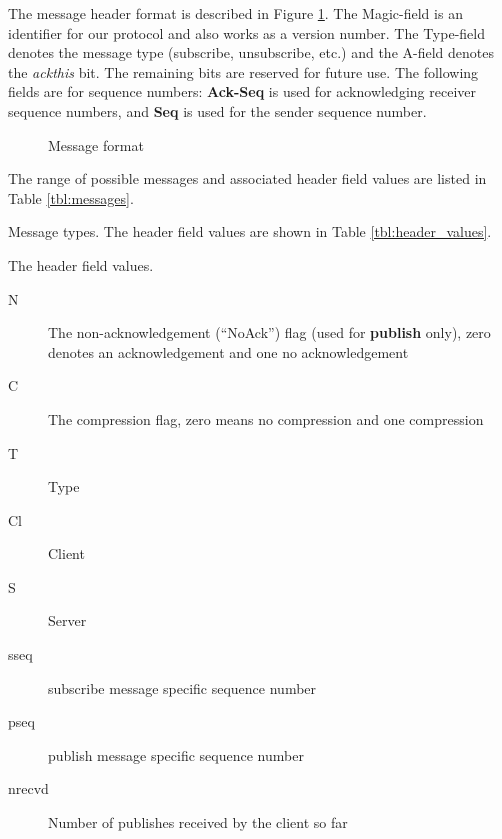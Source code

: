 \documentclass[a4paper]{article}
\begin{document}
The message header format is described in Figure \ref{fig:header}. The 
Magic-field is an identifier for our protocol and also works as a version
number. The Type-field denotes the message type (subscribe, unsubscribe, etc.)
and the A-field denotes the \textit{ackthis} bit. The remaining bits are reserved
for future use. The following fields are for sequence numbers: \textbf{Ack-Seq} 
is used for acknowledging receiver sequence numbers, and \textbf{Seq} is used 
for the sender sequence number.

\begin{figure}
	\begin{center}
		
		\caption{Message format}
		\label{fig:header}
	\end{center}
\end{figure}

The range of possible messages and associated header field values are listed in Table 
\ref{tbl:messages}.

\begin{table}
\begin{center}
\caption{Message types. The header field values are shown in Table \ref{tbl:header_values}.}

\label{tbl:messages}
\end{center}
\end{table}

\begin{table}
\caption{The header field values.}
\begin{description}
  \item[N] The non-acknowledgement (``NoAck'') flag (used for \textbf{publish} only), zero
  denotes an acknowledgement and one no acknowledgement
  \item[C] The compression flag, zero means no compression and one compression
  \item[T] Type
  \item[Cl] Client
  \item[S] Server
  \item[sseq] subscribe message specific sequence number
  \item[pseq] publish message specific sequence number
  \item[nrecvd] Number of publishes received by the client so far
\end{description}
\label{tbl:header_values}
\end{table}

\pagebreak
\end{document}
